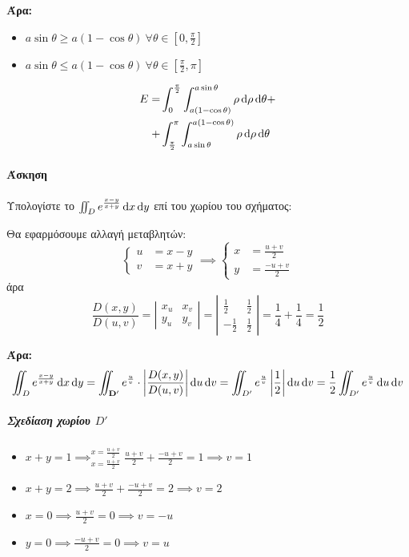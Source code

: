 \documentclass[11pt,a4paper,titlepage,draft]{article}
\begin{document}
\textbf{Άρα:}
\begin{itemize}
\item \(a\sin\theta \geq a(1-\cos\theta)\ \forall \theta \in [0,\frac{\pi}{2}]\)
\item \(a\sin\theta\leq a(1-\cos\theta)\ \forall \theta \in [\frac{\pi}{2},\pi]\)
\end{itemize}

\begin{align*}
E=&\int_0^\frac{\pi}{2}\int^{a\sin\theta}_{a(1-\cos\theta)}\rho\dif\rho\dif\theta +
\\
+&\int_\frac{\pi}{2}^\pi\int_{a\sin\theta}^{a(1-\cos\theta)}\rho\dif\rho\dif\theta
\end{align*}


\paragraph{Άσκηση}
Υπολογίστε το \(\iint_D e^{\frac{x-y}{x+y}} \dif x \dif y\) επί του χωρίου του σχήματος:

Θα εφαρμόσουμε αλλαγή μεταβλητών:
\[
\begin{cases}
u&=x-y\\v&=x+y
\end{cases}
\implies
\begin{cases}
x&=\frac{u+v}{2}\\
y&=\frac{-u+v}{2}
\end{cases}
\]
άρα
\[
\frac{D(x,y)}{D(u,v)} = \left|
\begin{matrix}
x_u&x_v\\y_u&y_v
\end{matrix}
\right|=\left|
\begin{matrix}
\frac{1}{2}&\frac{1}{2}\\-\frac{1}{2}&\frac{1}{2}
\end{matrix}
\right|=\frac{1}{4}+\frac{1}{4}=\frac{1}{2}
\]

\textbf{Άρα:}
\[
\iint_D e^{\frac{x-y}{x+y}}\dif x \dif y = \iint_\mathbf{D'}e^\frac{u}{v} \cdot \left|
\frac{D(x,y)}{D(u,v)}\right|\dif u \dif v = \iint_{D'} e^\frac{u}{v}\left|\frac{1}{2}\right| \dif u \dif v
= \frac{1}{2} \iint_{D'} e^\frac{u}{v} \dif u \dif v
\]

\subparagraph{Σχεδίαση χωρίου $D'$}
\begin{itemize}
\item \(x+y=1 \implies^{x=\frac{u+v}{2}}_{x=\frac{u+v}{2}} \frac{u+v}{2}+ \frac{-u+v}{2} = 1 \implies \boxed{v=1}\)\\
\item \(x+y=2 \implies \frac{u+v}{2}+ \frac{-u+v}{2} = 2 \implies \boxed{v=2}\)\\
\item \(x=0 \implies \frac{u+v}{2} = 0 \implies \boxed{v=-u}\)
\item \(y=0 \implies \frac{-u+v}{2} = 0 \implies \boxed{v=u}\)
\end{itemize}
\end{document}
